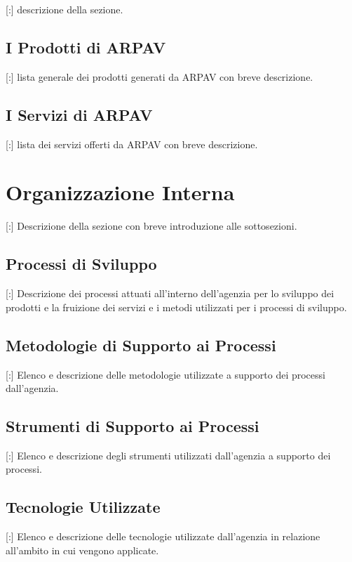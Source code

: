 [:] descrizione della sezione.

\subsection{I Prodotti di ARPAV}

[:] lista generale dei prodotti generati da ARPAV con breve descrizione.

\subsection{I Servizi di ARPAV}

[:] lista dei servizi offerti da ARPAV con breve descrizione.

\section{Organizzazione Interna}

[:] Descrizione della sezione con breve introduzione alle sottosezioni.

\subsection{Processi di Sviluppo}

[:] Descrizione dei processi attuati all'interno dell'agenzia per lo sviluppo dei prodotti e la fruizione dei servizi e i metodi utilizzati per i processi di sviluppo.

\subsection{Metodologie di Supporto ai Processi}

[:] Elenco e descrizione delle metodologie utilizzate a supporto dei processi dall'agenzia.

\subsection{Strumenti di Supporto ai Processi}

[:] Elenco e descrizione degli strumenti utilizzati dall'agenzia a supporto dei processi.

\subsection{Tecnologie Utilizzate}

[:] Elenco e descrizione delle tecnologie utilizzate dall'agenzia in relazione all'ambito in cui vengono applicate.

